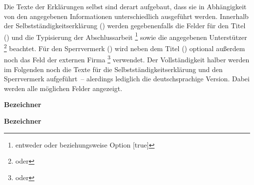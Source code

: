 \documentclass[%
  english,ngerman,%
  headings=optiontoheadandtoc,captions=tableheading,numbers=noenddot,%
  chapterpage,cdfoot,%
]{tudscrman}
\begin{document}
\begin{Declaration}{}
\begin{Declaration}{}
\printdeclarationlist%
Die Texte der Erklärungen selbst sind derart aufgebaut, dass sie in Abhängigkeit 
von den angegebenen Informationen unterschiedlich ausgeführt werden. Innerhalb 
der Selbstständigkeitserklärung () werden gegebenenfalls die 
Felder für den Titel () und die Typisierung der Abschlussarbeit%
\footnote{%
  entweder  oder 
  beziehungsweise Option [true]
}
sowie die angegebenen Unterstützer%
\footnote{%
  oder \PParameter{\dots}%
}
beachtet. Für den Sperrvermerk () wird neben dem Titel 
() optional außerdem noch das Feld der externen Firma%
\footnote{%
  oder \PParameter{\dots}%
}
verwendet. Der Vollständigkeit halber werden im Folgenden noch die Texte für die 
Selbstständigkeitserklärung und den Sperrvermerk aufgeführt~-- alerdings 
lediglich die deutschsprachige Version. Dabei werden alle möglichen Felder 
angezeigt.

\begingroup
  \makeatletter
  \def\@@title{\PName{Titel}}
  \def\@@thesis{\PName{Abschlussarbeit}}
  \def\@supporter{\PName{Vorname Nachname} \and \PName{Vorname Nachname}}
  \def\@company{\PName{Firma}}
  \makeatother

  \bigskip\noindent
  \textbf{Bezeichner}\quad{}\par
  \begin{center}\begin{minipage}{.8\textwidth}
  \confirmationtext
  \end{minipage}\end{center}
  
  \bigskip\noindent
  \textbf{Bezeichner}\quad{}\par
  \begin{center}\begin{minipage}{.8\textwidth}
  \restrictiontext
  \end{minipage}\end{center}
\endgroup
\end{Declaration}
\end{Declaration}
\end{document}
